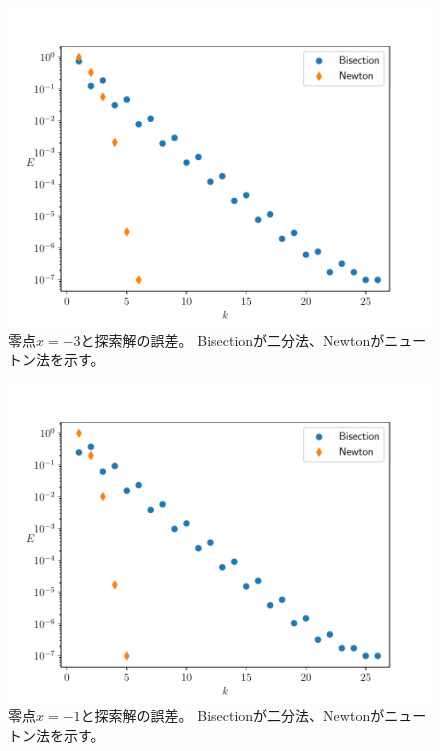 \documentclass[a4j, titlepage]{jsarticle}
\numberwithin{equation}{section}
\begin{document}
            \begin{figure}[h]
                \centering
                \includegraphics[width=0.8\hsize]{kadai1/change0.pdf}
                \caption{
                    零点$x=-3$と探索解の誤差。
                    Bisectionが二分法、Newtonがニュートン法を示す。
                }
                \label{fig:1fe0}
            \end{figure}
            \begin{figure}[h]
                \centering
                \includegraphics[width=0.8\hsize]{kadai1/change1.pdf}
                \caption{
                    零点$x=-1$と探索解の誤差。
                    Bisectionが二分法、Newtonがニュートン法を示す。
                }
                \label{fig:1fe1}
            \end{figure}
\end{document}
